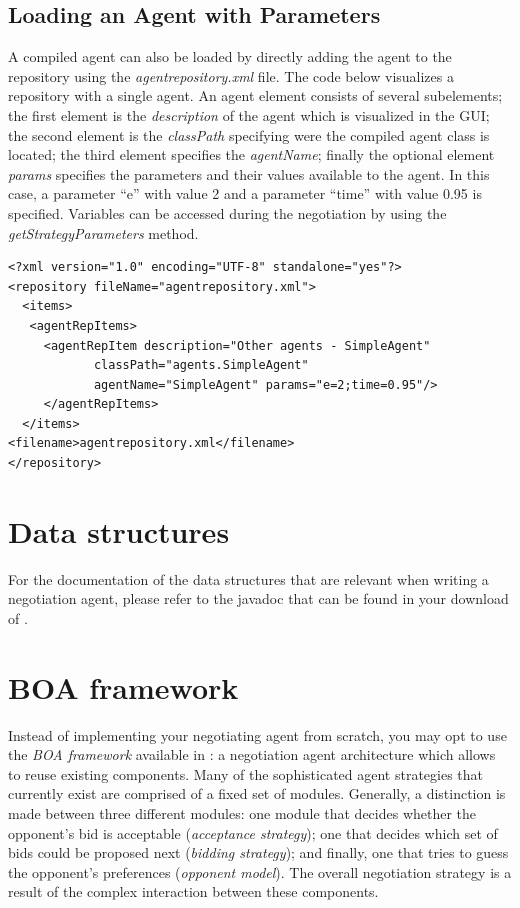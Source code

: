 \documentclass[]{article}
\begin{document}
\subsection{Loading an Agent with Parameters}
A compiled agent can also be loaded by directly adding the agent to the repository using the \textit{agentrepository.xml} file. The code below visualizes a repository with a single agent. An agent element consists of several subelements; the first element is the \textit{description} of the agent which is visualized in the GUI; the second element is the \textit{classPath} specifying were the compiled agent class is located; the third element specifies the \textit{agentName}; finally the optional element \textit{params} specifies the parameters and their values available to the agent. In this case, a parameter ``e'' with value 2 and a parameter ``time'' with value 0.95 is specified. Variables can be accessed during the negotiation by using the \textit{getStrategyParameters} method.

\begin{lstlisting}
<?xml version="1.0" encoding="UTF-8" standalone="yes"?>
<repository fileName="agentrepository.xml">
  <items>
   <agentRepItems>
     <agentRepItem description="Other agents - SimpleAgent"
			classPath="agents.SimpleAgent"
			agentName="SimpleAgent" params="e=2;time=0.95"/>
     </agentRepItems>
  </items>
<filename>agentrepository.xml</filename>
</repository>
\end{lstlisting}
 
\section{Data structures}
For the documentation of the data structures that are relevant when writing a negotiation agent, please refer to the javadoc that can be found in your download of \Genius. 

\section{BOA framework}
Instead of implementing your negotiating agent from scratch, you may opt to use the \textit{BOA framework} available in \Genius: a negotiation agent architecture which allows to reuse existing components. Many of the sophisticated agent strategies that currently exist are comprised of a fixed set of modules. Generally, a distinction is made between three different modules: one module that decides whether the opponent's bid is acceptable (\textit{acceptance strategy}); one that decides which set of bids could be proposed next (\textit{bidding strategy}); and finally, one that tries to guess the opponent's preferences (\textit{opponent model}). The overall negotiation strategy is a result of the complex interaction between these components.
\end{document}
